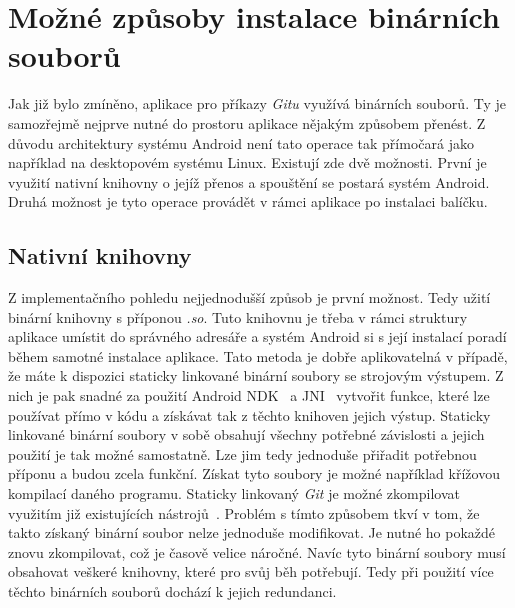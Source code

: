\section{Možné způsoby instalace binárních souborů}
Jak již bylo zmíněno, aplikace pro příkazy \emph{Gitu} využívá binárních souborů. Ty je samozřejmě nejprve nutné do prostoru aplikace nějakým způsobem přenést. Z důvodu architektury systému Android není tato operace tak přímočará jako například na desktopovém systému Linux. Existují zde dvě možnosti. První je využití nativní knihovny o jejíž přenos a spouštění se postará systém Android. Druhá možnost je tyto operace provádět v rámci aplikace po instalaci balíčku.

    \subsection{Nativní knihovny}
    Z implementačního pohledu nejjednodušší způsob je první možnost. Tedy užití binární knihovny s příponou \emph{.so}. Tuto knihovnu je třeba v rámci struktury aplikace umístit do správného adresáře a systém Android si s její instalací poradí během samotné instalace aplikace. Tato metoda je dobře aplikovatelná v případě, že máte k dispozici staticky linkované binární soubory se strojovým výstupem. Z nich je pak snadné za použití Android NDK~ a JNI~ vytvořit funkce, které lze používat přímo v kódu a získávat tak z těchto knihoven jejich výstup. Staticky linkované binární soubory v sobě obsahují všechny potřebné závislosti a jejich použití je tak možné samostatně. Lze jim tedy jednoduše přiřadit potřebnou příponu a budou zcela funkční. Získat tyto soubory je možné například křížovou kompilací daného programu. Staticky linkovaný \emph{Git} je možné zkompilovat využitím již existujících nástrojů~. Problém s tímto způsobem tkví v tom, že takto získaný binární soubor nelze jednoduše modifikovat. Je nutné ho pokaždé znovu zkompilovat, což je časově velice náročné. Navíc tyto binární soubory musí obsahovat veškeré knihovny, které pro svůj běh potřebují. Tedy při použití více těchto binárních souborů dochází k jejich redundanci.

    \newpage

